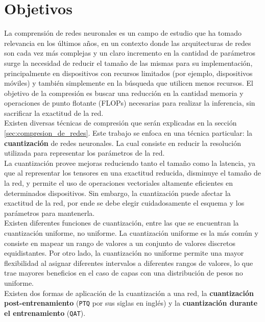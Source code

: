 \section{Objetivos}
\label{sec:objetivos}

La comprensión de redes neuronales es un campo de estudio que ha tomado relevancia en los últimos años, en un contexto donde las arquitecturas de redes son cada vez más complejas y un claro incremento en la cantidad de parámetros surge la necesidad de reducir el tamaño de las mismas para su implementación, principalmente en dispositivos con recursos limitados (por ejemplo, dispositivos móviles) y también simplemente en la búsqueda que utilicen menos recursos. El objetivo de la compresión es buscar una reducción en la cantidad memoria y operaciones de punto flotante (FLOPs) necesarias para realizar la inferencia, sin sacrificar la exactitud de la red. \\

Existen diversas técnicas de compresión que serán explicadas en la sección \ref{sec:compresion_de_redes}. Este trabajo se enfoca en una técnica particular: la \textbf{cuantización} de redes neuronales. La cual consiste en reducir la resolución utilizada para representar los parámetros de la red. \\

La cuantización provee mejoras reduciendo tanto el tamaño como la latencia, ya que al representar los tensores en una exactitud reducida, disminuye el tamaño de la red, y permite el uso de operaciones vectoriales altamente eficientes en determinados dispositivos. Sin embargo, la cuantización puede afectar la exactitud de la red, por ende se debe elegir cuidadosamente el esquema y los parámetros para mantenerla. \\

Existen diferentes funciones de cuantización, entre las que se encuentran la cuantización uniforme, no uniforme. La cuantización uniforme es la más común y consiste en mapear un rango de valores a un conjunto de valores discretos equidistantes. Por otro lado, la cuantización no uniforme permite una mayor flexibilidad al asignar diferentes intervalos a diferentes rangos de valores, lo que trae mayores beneficios en el caso de capas con una distribución de pesos no uniforme. \\

Existen dos formas de aplicación de la cuantización a una red, la \textbf{cuantización post-entrenamiento} (\texttt{PTQ} por sus siglas en inglés) y la \textbf{cuantización durante el entrenamiento} (\texttt{QAT}). \\

